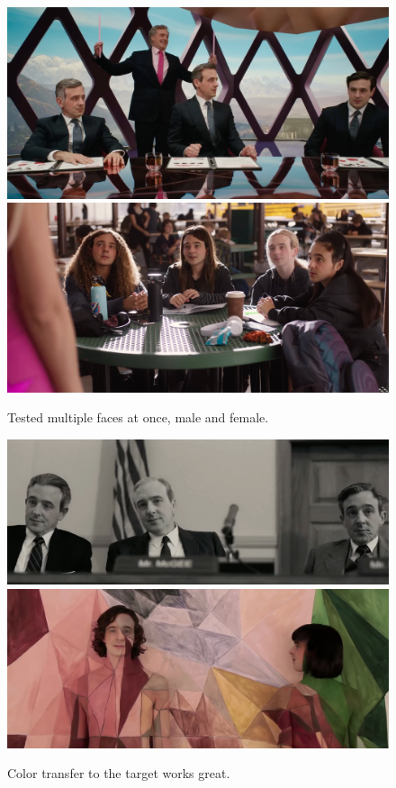 \documentclass[
  a4paper,  %
  twoside,  %
  bibliography=totoc,
  headsepline,
  cleardoublepage=empty,
  parskip=half,
  draft=false
]{scrbook}
\begin{document}
\begin{figure}[h]
  \centering
  \includegraphics[width=1\textwidth]{./graphics/images/inswapper/multiple1.png}
  \includegraphics[width=1\textwidth]{./graphics/images/inswapper/multiple2.png}
  \caption{Tested multiple faces at once, male and female.}
\end{figure}
\begin{figure}[h]
  \centering
  \includegraphics[width=1\textwidth]{./graphics/images/inswapper/oppenheimer2.png}
  \includegraphics[width=1\textwidth]{./graphics/images/inswapper/kimbra.png}
  \caption{Color transfer to the target works great.}
\end{figure}
\end{document}
